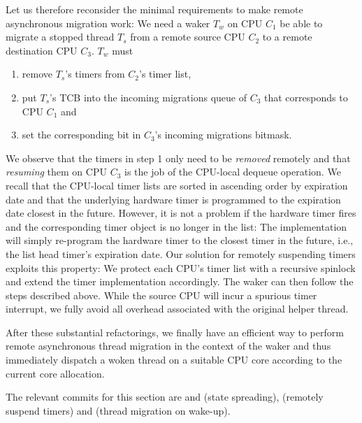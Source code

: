 \documentclass[12pt,a4paper]{book}
\begin{document}
Let us therefore reconsider the minimal requirements to make remote asynchronous migration work:
We need a waker $T_w$ on CPU $C_1$ be able to migrate a stopped thread $T_s$ from a remote source CPU $C_2$ to a remote destination CPU $C_3$. $T_w$ must
\begin{enumerate}
    \item remove $T_s$'s timers from $C_2$'s timer list,
    \item put $T_s$'s TCB into the incoming migrations queue of $C_3$ that corresponds to CPU $C_1$ and
    \item set the corresponding bit in $C_3$'s incoming migrations bitmask.
\end{enumerate}
We observe that the timers in step 1 only need to be \emph{removed} remotely and that \emph{resuming} them on CPU $C_3$ is the job of the CPU-local dequeue operation.
We recall that the CPU-local timer lists are sorted in ascending order by expiration date and that the underlying hardware timer is programmed to the expiration date closest in the future.
However, it is not a problem if the hardware timer fires and the corresponding timer object is no longer in the list:
The implementation will simply re-program the hardware timer to the closest timer in the future, i.e., the list head timer's expiration date.
Our solution for remotely suspending timers exploits this property:
We protect each CPU's timer list with a recursive spinlock and extend the timer implementation accordingly.
The waker can then follow the steps described above.
While the source CPU will incur a spurious timer interrupt, we fully avoid all overhead associated with the original helper thread.

After these substantial refactorings, we finally have an efficient way to perform remote asynchronous thread migration in the context of the waker and thus immediately dispatch a woken thread on a suitable CPU core according to the current core allocation.

The relevant commits for this section are  and  (state spreading),  (remotely suspend timers) and  (thread migration on wake-up).
\end{document}
